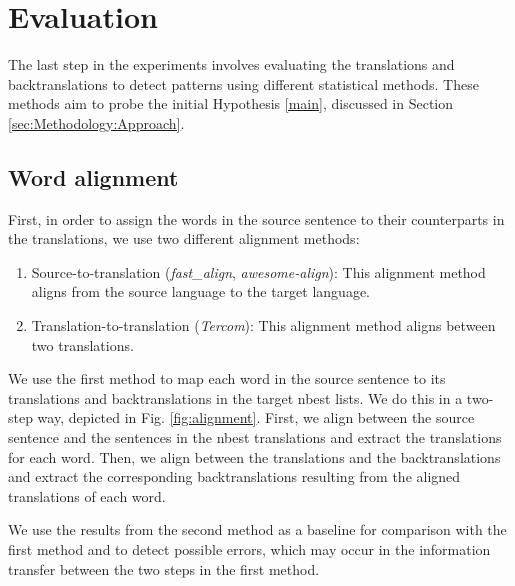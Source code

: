 
\section{Evaluation}

The last step in the experiments involves evaluating the translations and backtranslations to detect patterns using different statistical methods. These methods aim to probe the initial Hypothesis \ref{main}, discussed in Section \ref{sec:Methodology:Approach}.

\subsection{Word alignment}
\label{sec:Experiments:Alignment}


First, in order to assign the words in the source sentence to their counterparts in the translations, we use two different alignment methods:

\begin{enumerate}
    \item Source-to-translation (\textit{fast\_align}, \textit{awesome-align}): This alignment method aligns from the source language to the target language.
    \item Translation-to-translation (\textit{Tercom}): This alignment method aligns between two translations.
\end{enumerate}

We use the first method to map each word in the source sentence to its translations and backtranslations in the target nbest lists. We do this in a two-step way, depicted in Fig. \ref{fig:alignment}. First, we align between the source sentence and the sentences in the nbest translations and extract the translations for each word. Then, we align between the translations and the backtranslations and extract the corresponding backtranslations resulting from the aligned translations of each word. 

We use the results from the second method as a baseline for comparison with the first method and to detect possible errors, which may occur in the information transfer between the two steps in the first method.

